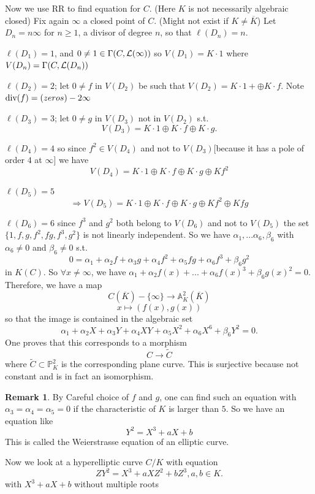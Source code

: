 \documentclass[11pt]{article}
\theoremstyle{definition}
\newtheorem{rmk}[thm]{Remark}
\newcommand{\affn}{\mathbb A}
\newcommand{\proj}{\mathbb P}
\newcommand{\call}{{\cal L}}
\renewcommand{\div}{\textnormal{div}}
\newcommand{\Lrta}{\Longrightarrow}
\newcommand{\lrta}{\longrightarrow}
\begin{document}
Now we use RR to find equation for $C$.  (Here $K$ is not necessarily algebraic closed) Fix again $\infty$ a closed point of $C$. (Might not exist if $K\neq \overline{K}$) Let $D_n=n\infty$ for $n\geq 1$, a divisor of degree $n$, so that $\ell(D_n)=n$. 

$\ell(D_1)=1$, and $0\neq 1 \in \Gamma(C,\call(\infty))$ so $V(D_1)=K\cdot 1$ where $V(D_n)=\Gamma(C,\call(D_n))$

$\ell(D_2)=2$; let $0\neq f$ in $V(D_2)$ be such that $V(D_2)=K\cdot 1+\oplus K\cdot f$. Note $\div(f)=(zeros)-2\infty$

$\ell(D_3)=3$; let $0\neq g$ in $V(D_3)$ not in $V(D_2)$ s.t. 
$$
V(D_3)=K\cdot 1\oplus K\cdot f\oplus K \cdot g.
$$

$\ell(D_4)=4$ so since $f^2\in V(D_4)$ and not to $V(D_3)$[because it has a pole of order $4$ at $\infty$]  we have 
$$
V(D_4)=K\cdot 1\oplus K\cdot f\oplus K \cdot g\oplus K f^2
$$

$\ell(D_5)=5$
$$
\Lrta V(D_5)=K\cdot 1\oplus K\cdot f\oplus K \cdot g\oplus K f^2\oplus Kfg
$$

$\ell(D_6)=6$
since $f^3$ and $g^2$ both belong to $V(D_6)$ and not to $V(D_5) $ the set $\{1,f,g,f^2,fg,f^3,g^2\}$ is not linearly independent. So we have $\alpha_1,...\alpha_6,\beta_6$ with $\alpha_6\neq 0 $ and $\beta_6\neq 0$ s.t.
$$
0=\alpha_1+\alpha_2 f+\alpha_3 g+\alpha_4 f^2+\alpha_5 fg+\alpha_6 f^3+\beta_6 g^2
$$
in $K(C)$. So $\forall x\neq \infty$, we have $\alpha_1+\alpha_2 f(x)+...+\alpha_6 f(x)^3+\beta_6 g(x)^2=0$. Therefore, we have a map
$$
C(\overline{K})-\{\infty\}\lrta \affn^2_K(\overline{K})
$$
$$
x\longmapsto (f(x),g(x))
$$
so that the  image is contained in the algebraic set
$$
\alpha_1+\alpha_2X+\alpha_3Y+\alpha_4XY+\alpha_5 X^2+\alpha_6 X^6+\beta_6 Y^2=0.
$$
One proves that this corresponds to a morphism
$$
C\lrta\tilde{C}
$$
where $\tilde{C}\subset \proj^2_K$ is the corresponding plane curve. This is surjective because not constant and is in fact an isomorphism. 

\begin{rmk}
By Careful choice of $f$ and $g$, one can find such an equation with $\alpha_3=\alpha_4=\alpha_5=0$ if the characteristic of $K$ is larger than $5$. So we have an equation like 
$$
Y^2=X^3+aX+b
$$
This is called the Weierstrasse equation of an elliptic curve. 
\end{rmk}


Now we look at a hyperelliptic  curve $C/K$ with equation
$$
ZY^2=X^3+aXZ^2+bZ^3, a, b\in K.
$$
with $X^3+aX+b$ without multiple roots 
\end{document}
